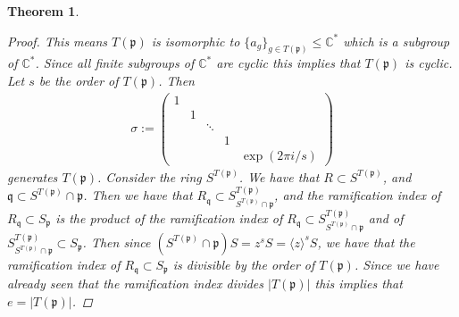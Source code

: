 \documentclass[11pt, a4paper, english]{article}
\newtheorem{theorem}{Theorem}[section]
\theoremstyle{definition}
\newcommand{\C}{\mathbb{C}}
\begin{document}
\begin{theorem}
\begin{proof}
This means $T(\mathfrak{p})$ is isomorphic to $\{ a_g \}_{g \in T(\mathfrak{p})} \leq \C^*$ which is a subgroup of $\C^*$. Since all finite subgroups of $\C^*$ are cyclic this implies that $T(\mathfrak{p})$ is cyclic. Let $s$ be the order of $T(\mathfrak{p})$. Then
\begin{align*}
\sigma :=
\begin{pmatrix}
1\\
& 1\\
&& \ddots\\
&&&1\\
&&&& \exp(2\pi i/s)
\end{pmatrix}
\end{align*}
generates $T(\mathfrak{p})$. Consider the ring $S^{T(\mathfrak{p})}$. We have that $R \subset S^{T(\mathfrak{p})}$, and $\mathfrak{q} \subset S^{T(\mathfrak{p})} \cap \mathfrak{p}$. Then we have that $R_\mathfrak{q} \subset S^{T(\mathfrak{p})}_{S^{T(\mathfrak{p})} \cap \mathfrak{p}}$, and the ramification index of $R_\mathfrak{q} \subset S_\mathfrak{p}$ is the product of the ramification index of $R_\mathfrak{q} \subset S^{T(\mathfrak{p})}_{S^{T(\mathfrak{p})} \cap \mathfrak{p}}$ and of $S^{T(\mathfrak{p})}_{S^{T(\mathfrak{p})} \cap \mathfrak{p}} \subset S_\mathfrak{p}$. Then since $(S^{T(\mathfrak{p})} \cap \mathfrak{p})S = z^s S = \langle z \rangle^s S$, we have that the ramification index of $R_\mathfrak{q} \subset S_\mathfrak{p}$ is divisible by the order of $T(\mathfrak{p})$. Since we have already seen that the ramification index divides $|T(\mathfrak{p})|$ this implies that $e = |T(\mathfrak{p})|$.
\end{proof}
\end{theorem}
\end{document}
